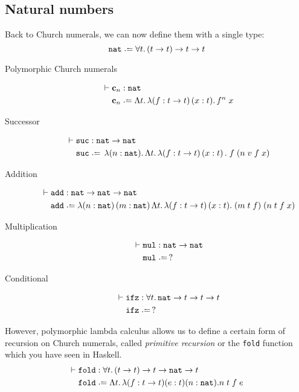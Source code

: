 \subsection{Natural numbers}
Back to Church numerals, we can now define them with a single type:
\[
  \nat \defeq \forall t.\, (t\to t)\to t\to t
\]
  \begin{description}
    \item[Polymorphic Church numerals]
      \begin{align*}
        \vdash{} & \bc_n : \nat \\
        & \bc_n \defeq \Lambda t.\,\lambda (f:t \to t)\,(x:t).\,
        f^n\;x
      \end{align*}
    \item[Successor]
      \begin{align*}
        \vdash{} & \suc : \nat \to \nat \\
        & \suc \defeq \,\lambda (n : \nat).\,\Lambda t.\,\lambda
        (f : t \to t)\,(x:t)\,.\;f\;(n\;v\;f\;x) 
      \end{align*}
    \item[Addition]
      \begin{align*}
        \vdash{} & \add : \nat \to \nat \to \nat \\
        & \add \defeq \lambda (n : \nat)\,(m:\nat)\,\Lambda t.\,
        \lambda (f:t\to t)\,(x: t).\; (m\;t\;f)\;(n\;t\;f\;x) 
      \end{align*}
    \item[Multiplication] 
      \begin{align*}
      \vdash{} & \mul : \nat\to \nat \\
        & \mul \defeq\,?
      \end{align*}
    \item[Conditional]
      \begin{align*}
        \vdash {} & \ifz : \forall t.\,\nat \to t \to t \to t \\
        & \ifz \defeq\,?
      \end{align*}
  \end{description}
However, polymorphic lambda calculus allows us to define a certain form of
recursion on Church numerals, called \emph{primitive recursion} or the
\texttt{fold} function which you have seen in Haskell.
\begin{align*}
  \vdash{} & \mathtt{fold} : \forall t.\, (t \to t) \to t \to \nat \to t  \\
  & \mathtt{fold} \defeq \Lambda t.\, \lambda (f : t \to t)(e : t)(n : \nat). 
  n\;t\;f\;e
\end{align*}
